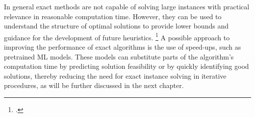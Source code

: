 \parbreak

In general exact methods are not capable of solving large instances with practical relevance
in reasonable computation time. However, they can be used to understand the structure
of optimal solutions to provide lower bounds and guidance for the development of future
heuristics. \footcite[cf.][p. 2]{tamke_branch-and-cut_2024} A possible approach to improving
the performance of exact algorithms is the use of speed-ups, such as pretrained \gls{ML} models.
These models can substitute parts of the algorithm's computation time by predicting solution
feasibility or by quickly identifying good solutions, thereby reducing the need for exact instance
solving in iterative procedures, as will be further discussed in the next chapter.
